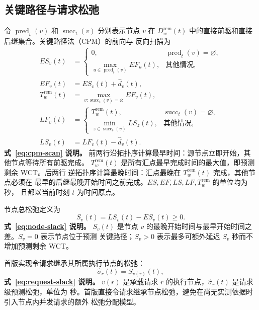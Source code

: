 \documentclass[UTF8,11pt,a4paper,fontset=fandol]{ctexart}
\begin{document}
\subsection{关键路径与请求松弛}

令 $\operatorname{pred}_t(v)$ 和 $\operatorname{succ}_t(v)$ 分别表示节点 $v$ 在
$D_w^{\mathrm{rem}}(t)$ 中的直接前驱和直接后继集合。关键路径法（CPM）的前向与
反向扫描为
\begin{equation}
  \begin{aligned}
    ES_v(t)
      &=\begin{cases}
          0, & \operatorname{pred}_t(v)=\varnothing,\\
          \max_{u\in\operatorname{pred}_t(v)}EF_u(t), & \text{其他情况},
        \end{cases}\\
    EF_v(t)&=ES_v(t)+\widehat d_v(t),\\
    T_w^{\mathrm{rem}}(t)
      &=\max_{v:\operatorname{succ}_t(v)=\varnothing}EF_v(t),\\
    LF_v(t)
      &=\begin{cases}
          T_w^{\mathrm{rem}}(t), & \operatorname{succ}_t(v)=\varnothing,\\
          \min_{z\in\operatorname{succ}_t(v)}LS_z(t), & \text{其他情况},
        \end{cases}\\
    LS_v(t)&=LF_v(t)-\widehat d_v(t).
  \end{aligned}
  \label{eq:cpm-scan}
\end{equation}
\noindent\textbf{式~\eqref{eq:cpm-scan} 说明。}
前两行沿拓扑序计算最早时间：源节点立即开始，其他节点等待所有前驱完成。
$T_w^{\mathrm{rem}}(t)$ 是所有汇点最早完成时间的最大值，即预测剩余 WCT。后两行
逆拓扑序计算最晚时间：汇点最晚在 $T_w^{\mathrm{rem}}(t)$ 完成，其他节点必须在
最早的后继最晚开始时间之前完成。$ES,EF,LS,LF,T_w^{\mathrm{rem}}$ 的单位均为秒，
且都以当前时刻 $t$ 为时间原点。

节点总松弛定义为
\begin{equation}
  S_v(t)=LS_v(t)-ES_v(t)\ge 0.
  \label{eq:node-slack}
\end{equation}
\noindent\textbf{式~\eqref{eq:node-slack} 说明。}
$S_v(t)$ 是节点 $v$ 的最晚开始时间与最早开始时间之差。$S_v=0$ 表示节点位于预测
关键路径；$S_v>0$ 表示最多可额外延迟 $S_v$ 秒而不增加预测剩余 WCT。

首版实现令请求继承其所属执行节点的松弛：
\begin{equation}
  \widehat{\sigma}_r(t)=S_{v(r)}(t),
  \label{eq:request-slack}
\end{equation}
\noindent\textbf{式~\eqref{eq:request-slack} 说明。}
$v(r)$ 是承载请求 $r$ 的执行节点，$\widehat\sigma_r(t)$ 是请求级预测松弛，单位为
秒。首版直接令请求继承节点松弛，避免在尚无实测依据时引入节点内并发请求的额外
松弛分配模型。
\end{document}
